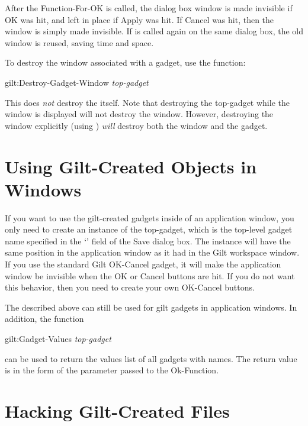 After the Function-For-OK is called, the dialog box window is made
invisible if OK was hit, and left in place if Apply was hit.  If
Cancel was hit, then the window is simply
made invisible.  If  is called again on the same
dialog box, the old window is reused, saving time and space.

To destroy the window associated with a gadget, use the function:
\begin{programexample}
gilt:Destroy-Gadget-Window {\it top-gadget}\value{function}
\end{programexample}
This does {\it not} destroy the  itself.  Note that
destroying the top-gadget while the window is displayed will not
destroy the window.  However, destroying the window explicitly (using
) {\it will} destroy both the window and the gadget.

\section{Using Gilt-Created Objects in Windows}
\label{using}

If you want to use the gilt-created gadgets inside of an application
window, you only need to create an instance of the top-gadget, which
is the top-level gadget name specified in the
`' field of the Save dialog box.  The
instance will have the same position in the application window as it had
in the Gilt workspace window.  If you use the
standard Gilt OK-Cancel gadget, it will make the application
window be invisible when the OK or Cancel buttons are hit.  If you do
not want this behavior, then you need to create your own OK-Cancel
buttons.

The  described above can still be used for gilt
gadgets in application windows.  In addition, the function
\begin{programexample}
gilt:Gadget-Values {\it top-gadget}\value{function}
\end{programexample}
can be used to return the values list of all gadgets with names.  The
return value is in the form of the  parameter passed to the
Ok-Function.



\section{Hacking Gilt-Created Files}


